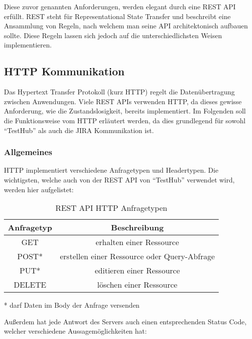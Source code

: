 Diese zuvor genannten Anforderungen, werden elegant durch eine \gls{REST} \gls{API}
erfüllt. REST steht für Representational State Transfer und beschreibt eine Ansammlung von
Regeln, nach welchem man seine \gls{API} architektonisch aufbauen sollte. Diese 
Regeln lassen sich jedoch auf die unterschiedlichsten Weisen implementieren. 

\subsection{HTTP Kommunikation}\label{sec:HTTP}
Das Hypertext Transfer Protokoll (kurz HTTP) regelt die Datenübertragung zwischen
Anwendungen. Viele \gls{REST} \gls{API}s verwenden HTTP, da dieses gewisse
Anforderung, wie die Zustandslosigkeit, bereits implementiert. Im Folgenden soll
die Funktionsweise vom HTTP erläutert werden, da dies grundlegend für sowohl ``TestHub''
als auch die \gls{JIRA} Kommunikation ist.

\subsubsection{Allgemeines}
HTTP implementiert verschiedene Anfragetypen und Headertypen. Die wichtigsten,
welche auch von der \gls{REST} \gls{API} von ``TestHub'' verwendet wird, werden 
hier aufgelistet:

\begin{table}[h!]
    \centering
    \begin{tabular}{|c | c|} 
     \hline
     \textbf{Anfragetyp} & \textbf{Beschreibung} \\ [1ex] 
     \hline
     GET & erhalten einer Ressource \\ [1ex]
     \hline
     POST* & erstellen einer Ressource oder Query-Abfrage \\ [1ex] 
     \hline
     PUT* & editieren einer Ressource \\ [1ex] 
     \hline
     DELETE & löschen einer Ressource \\ [1ex] 
     \hline
    \end{tabular}
    \caption{REST API HTTP Anfragetypen}
    * darf Daten im Body der Anfrage versenden
    \label{table:requests}
\end{table}

Außerdem hat jede Antwort des Servers auch einen entsprechenden Status Code, 
welcher verschiedene Aussagemöglichkeiten hat:


